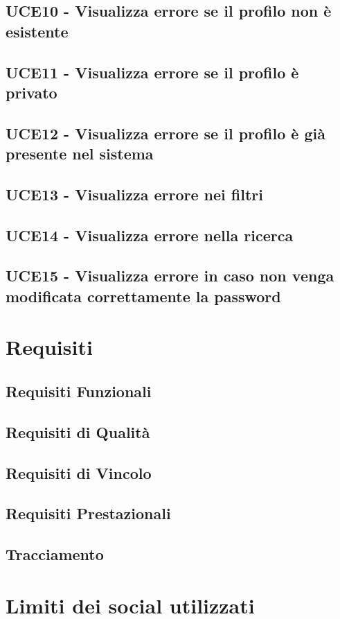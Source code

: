 \documentclass[a4paper]{article}
\begin{document}
	\subsection{UCE10 - Visualizza errore se il profilo non è esistente}
	
	
	\subsection{UCE11 - Visualizza errore se il profilo è privato}
	
	
	\subsection{UCE12 - Visualizza errore se il profilo è già presente nel sistema}
	
	
	\subsection{UCE13 - Visualizza errore nei filtri}
	
	
	\subsection{UCE14 - Visualizza errore nella ricerca}
	
	
	\subsection{UCE15 - Visualizza errore in caso non venga modificata correttamente la password}
	

	\newpage	
	
	\section{Requisiti}
	
	
	\subsection{Requisiti Funzionali}
	
	
	\subsection{Requisiti di Qualità}
	
	
	\subsection{Requisiti di Vincolo}
	
	
	\subsection{Requisiti Prestazionali}
		
	
	\subsection{Tracciamento}
		
	\newpage

	\section{Limiti dei social utilizzati}
	
	
\end{document}
